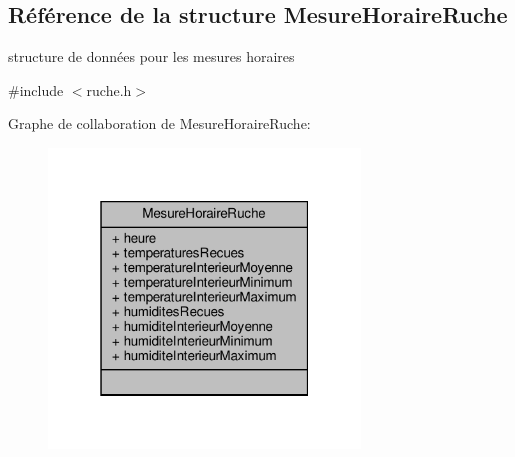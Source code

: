 \hypertarget{struct_mesure_horaire_ruche}{}\subsection{Référence de la structure Mesure\+Horaire\+Ruche}
\label{struct_mesure_horaire_ruche}


structure de données pour les mesures horaires  




{\ttfamily \#include $<$ruche.\+h$>$}



Graphe de collaboration de Mesure\+Horaire\+Ruche\+:\nopagebreak
\begin{figure}[H]
\begin{center}
\leavevmode
\includegraphics[width=235pt]{struct_mesure_horaire_ruche__coll__graph}
\end{center}
\end{figure}
